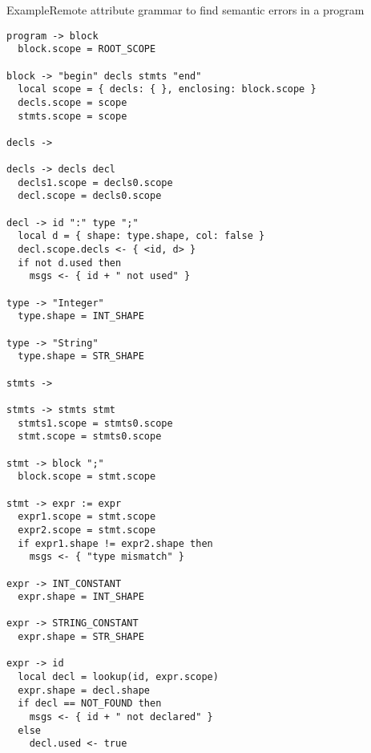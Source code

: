 \begin{frame}[fragile=singleslide]{Example}{Remote attribute grammar to find semantic errors in a program}

\begin{centering}
\begin{multicols}{2}
\begin{Verbatim}[fontsize=\fontsize{5.5}{6}\selectfont]
program -> block
  block.scope = ROOT_SCOPE

block -> "begin" decls stmts "end"
  local scope = { decls: { }, enclosing: block.scope }
  decls.scope = scope
  stmts.scope = scope

decls ->

decls -> decls decl
  decls1.scope = decls0.scope
  decl.scope = decls0.scope

decl -> id ":" type ";"
  local d = { shape: type.shape, col: false } 
  decl.scope.decls <- { <id, d> }
  if not d.used then
    msgs <- { id + " not used" }

type -> "Integer"
  type.shape = INT_SHAPE

type -> "String"
  type.shape = STR_SHAPE

stmts -> 

stmts -> stmts stmt
  stmts1.scope = stmts0.scope
  stmt.scope = stmts0.scope

stmt -> block ";"
  block.scope = stmt.scope

stmt -> expr := expr
  expr1.scope = stmt.scope
  expr2.scope = stmt.scope
  if expr1.shape != expr2.shape then
    msgs <- { "type mismatch" }

expr -> INT_CONSTANT
  expr.shape = INT_SHAPE

expr -> STRING_CONSTANT
  expr.shape = STR_SHAPE

expr -> id
  local decl = lookup(id, expr.scope)
  expr.shape = decl.shape
  if decl == NOT_FOUND then
    msgs <- { id + " not declared" }
  else
    decl.used <- true
\end{Verbatim}
\end{multicols}
\end{centering}

\end{frame}





